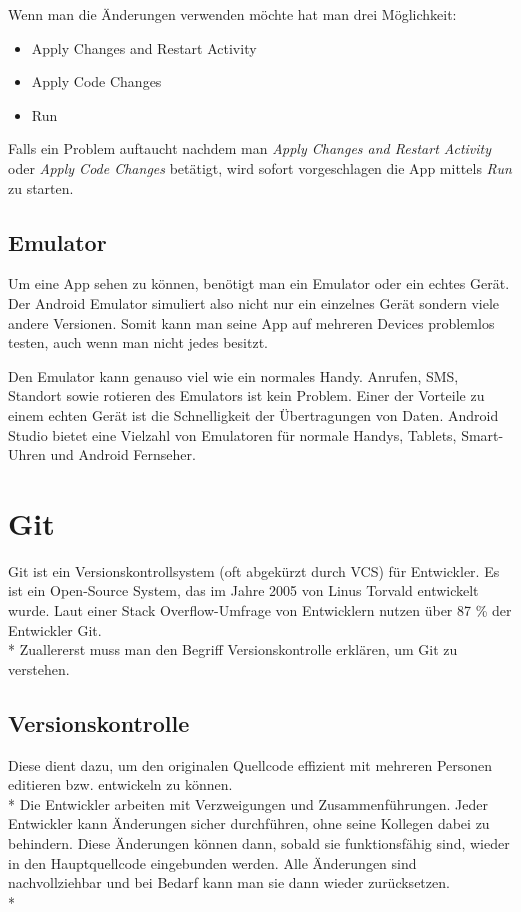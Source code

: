 Wenn man die Änderungen verwenden möchte hat man drei Möglichkeit:
\begin{itemize}
    \item Apply Changes and Restart Activity
    \item Apply Code Changes 
    \item Run 
\end{itemize}

Falls ein Problem auftaucht nachdem man \textit{Apply Changes and Restart Activity} oder \textit{Apply Code Changes} betätigt,
wird sofort vorgeschlagen die App mittels \textit{Run} zu starten. 

\subsection{Emulator}
Um eine App sehen zu können, benötigt man ein Emulator oder ein echtes Gerät. 
Der Android Emulator simuliert also nicht nur ein einzelnes Gerät sondern viele andere Versionen.
Somit kann man seine App auf mehreren Devices problemlos testen, auch wenn man nicht jedes besitzt.

Den Emulator kann genauso viel wie ein normales Handy. Anrufen, SMS, Standort sowie rotieren des Emulators ist kein Problem.
Einer der Vorteile zu einem echten Gerät ist die Schnelligkeit der Übertragungen von Daten. Android Studio bietet 
eine Vielzahl von Emulatoren für normale Handys, Tablets, Smart-Uhren und Android Fernseher. 



\section{Git}
\author{Benjamin Besic}
Git ist ein Versionskontrollsystem (oft abgekürzt durch VCS) für Entwickler. Es ist ein Open-Source System, das im Jahre 2005
von Linus Torvald entwickelt wurde. Laut einer Stack Overflow-Umfrage von Entwicklern nutzen über 87 \% der Entwickler Git.
\cite{GitKinsta}
\\* Zuallererst muss man den Begriff Versionskontrolle erklären, um Git zu verstehen.
\subsection{Versionskontrolle}
Diese dient dazu, um den originalen Quellcode effizient mit mehreren Personen editieren bzw. entwickeln zu können. 
\\* Die Entwickler arbeiten mit Verzweigungen und Zusammenführungen. Jeder Entwickler kann Änderungen sicher durchführen, ohne seine Kollegen dabei 
zu behindern. Diese Änderungen können dann, sobald sie funktionsfähig sind, wieder in den Hauptquellcode eingebunden werden.
Alle Änderungen sind nachvollziehbar und bei Bedarf kann man sie dann wieder zurücksetzen.
\cite{GitKinsta} \\*

